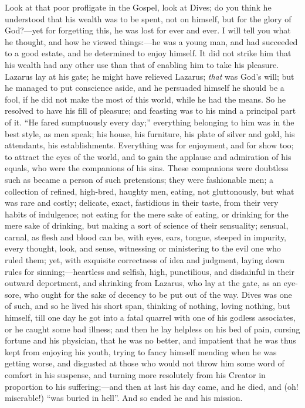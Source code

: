 Look at that poor profligate in the Gospel, look at Dives; do you
think he understood that his wealth was to be spent, not on himself,
but for the glory of God?—yet for forgetting this, he was lost for
ever and ever. I will tell you what he thought, and how he viewed
things:—he was a young man, and had succeeded to a good estate, and
he determined to enjoy himself. It did not strike him that his wealth
had any other use than that of enabling him to take his pleasure.
Lazarus lay at his gate; he might have relieved Lazarus; \emph{that}
was God's will; but he managed to put conscience aside, and he
persuaded himself he should be a fool, if he did not make the most of
this world, while he had the means. So he resolved to have his fill of
pleasure; and feasting was to his mind a principal part of it.
``He fared sumptuously every day;'' everything belonging to
him was in the best style, as men speak; his house, his furniture, his
plate of silver and gold, his attendants, his establishments.
Everything was for enjoyment, and for show too; to attract the eyes of
the world, and to gain the applause and admiration of his equals, who
were the companions of his sins. These companions were doubtless such
as became a person of such pretensions; they were fashionable men; a
collection of refined, high-bred, haughty men, eating, not
gluttonously, but what was rare and costly; delicate, exact,
fastidious in their taste, from their very habits of indulgence; not
eating for the mere sake of eating, or drinking for the mere sake of
drinking, but making a sort of science of their sensuality; sensual,
carnal, as flesh and blood can be, with eyes, ears, tongue, steeped in
impurity, every thought, look, and sense, witnessing or ministering to
the evil one who ruled them; yet, with exquisite correctness of idea
and judgment, laying down rules for sinning;—heartless and selfish,
high, punctilious, and disdainful in their outward deportment, and
shrinking from Lazarus, who lay at the gate, as an eye-sore, who ought
for the sake of decency to be put out of the way. Dives was one of
such, and so he lived his short span, thinking of nothing, loving
nothing, but himself, till one day he got into a fatal quarrel with
one of his godless associates, or he caught some bad illness; and then
he lay helpless on his bed of pain, cursing fortune and his physician,
that he was no better, and impatient that he was thus kept from
enjoying his youth, trying to fancy himself mending when he was
getting worse, and disgusted at those who would not throw him some
word of comfort in his suspense, and turning more resolutely from his
Creator in proportion to his suffering;—and then at last his day
came, and he died, and (oh! miserable!) ``was buried in
hell''. And so ended he and his mission.

